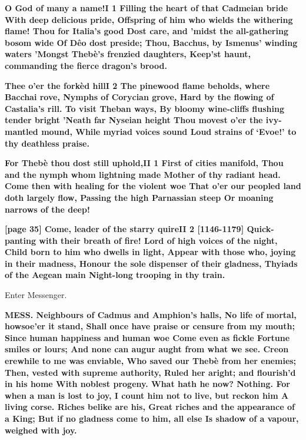 \documentclass[11pt,letter]{book}
\begin{document}
\par \textbf{O God of many a name!I 1 Filling the heart of that Cadmeian bride With deep delicious pride, Offspring of him who wields the withering flame! Thou for Italia’s good Dost care, and ’midst the all-gathering bosom wide Of Dêo dost preside; Thou, Bacchus, by Ismenus’ winding waters ’Mongst Thebè’s frenzied daughters, Keep’st haunt, commanding the fierce dragon’s brood.}
\par 

\par \textbf{Thee o’er the forkèd hillI 2 The pinewood flame beholds, where Bacchai rove, Nymphs of Corycian grove, Hard by the flowing of Castalia’s rill. To visit Theban ways, By bloomy wine-cliffs flushing tender bright ’Neath far Nyseian height Thou movest o’er the ivy-mantled mound, While myriad voices sound Loud strains of ‘Evoe!’ to thy deathless praise.}
\par 

\par \textbf{For Thebè thou dost still uphold,II 1 First of cities manifold, Thou and the nymph whom lightning made Mother of thy radiant head. Come then with healing for the violent woe That o’er our peopled land doth largely flow, Passing the high Parnassian steep Or moaning narrows of the deep!}
\par 

\par \textbf{[page 35] Come, leader of the starry quireII 2 [1146-1179] Quick-panting with their breath of fire! Lord of high voices of the night, Child born to him who dwells in light, Appear with those who, joying in their madness, Honour the sole dispenser of their gladness, Thyiads of the Aegean main Night-long trooping in thy train.}
\par 

\par  Enter Messenger.

\par \textbf{MESS. Neighbours of Cadmus and Amphion’s halls, No life of mortal, howsoe’er it stand, Shall once have praise or censure from my mouth; Since human happiness and human woe Come even as fickle Fortune smiles or lours; And none can augur aught from what we see. Creon erewhile to me was enviable, Who saved our Thebè from her enemies; Then, vested with supreme authority, Ruled her aright; and flourish’d in his home With noblest progeny. What hath he now? Nothing. For when a man is lost to joy, I count him not to live, but reckon him A living corse. Riches belike are his, Great riches and the appearance of a King; But if no gladness come to him, all else Is shadow of a vapour, weighed with joy.}
\par 
\end{document}
